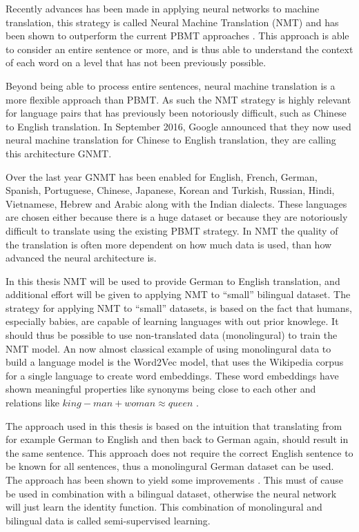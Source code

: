 Recently advances has been made in applying neural networks to machine translation, this strategy is called Neural Machine Translation (NMT) and has been shown to outperform the current PBMT approaches \cite{google-translate-gnmt}. This approach is able to consider an entire sentence or more, and is thus able to understand the context of each word on a level that has not been previously possible.

Beyond being able to process entire sentences, neural machine translation is a more flexible approach than PBMT. As such the NMT strategy is highly relevant for language pairs that has previously been notoriously difficult, such as Chinese to English translation. In September 2016, Google announced that they now used neural machine translation for Chinese to English translation, they are calling this architecture GNMT.

Over the last year GNMT has been enabled for English, French, German, Spanish, Portuguese, Chinese, Japanese, Korean and Turkish, Russian, Hindi, Vietnamese, Hebrew and Arabic along with the Indian dialects. These languages are chosen either because there is a huge dataset or because they are notoriously difficult to translate using the existing PBMT strategy. In NMT the quality of the translation is often more dependent on how much data is used, than how advanced the neural architecture is.

In this thesis NMT will be used to provide German to English translation, and additional effort will be given to applying NMT to ``small'' bilingual dataset. The strategy for applying NMT to ``small'' datasets, is based on the fact that humans, especially babies, are capable of learning languages with out prior knowlege. It should thus be possible to use non-translated data (monolingural) to train the NMT model. An now almost classical example of using monolingural data to build a language model is the Word2Vec model, that uses the Wikipedia corpus for a single language to create word embeddings. These word embeddings have shown meaningful properties like synonyms being close to each other and relations like $king - man + woman \approx queen$ \cite{word2vec}.

The approach used in this thesis is based on the intuition that translating from for example German to English and then back to German again, should result in the same sentence. This approach does not require the correct English sentence to be known for all sentences, thus a monolingural German dataset can be used. The approach has been shown to yield some improvements \cite{semi-supervised-nmt}. This must of cause be used in combination with a bilingual dataset, otherwise the neural network will just learn the identity function. This combination of monolingural and bilingual data is called semi-supervised learning.

